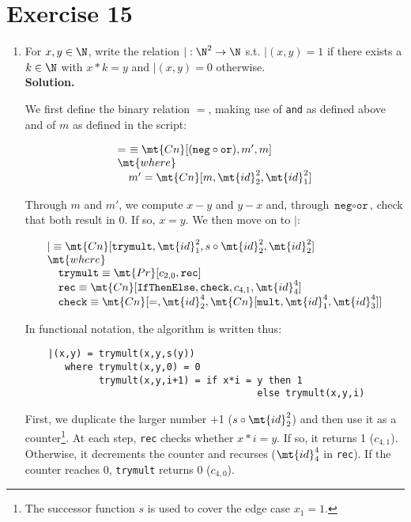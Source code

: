 \section{Exercise 15}

\begin{enumerate}
	\item For $x,y \in \N$, write the relation $| : \N^2 \rightarrow \N$ s.t. $|(x,y) = 1$ if there exists a $k \in \N$ with $x*k = y$ and $|(x,y) = 0$ otherwise.\\
	
	\textbf{Solution.}
	
	We first define the binary relation $=$, making use of \texttt{and} as defined above and of $m$ as defined in the script:
	
	$$
		\begin{array}{l}
			=\ \equiv \mt{Cn}[(\texttt{neg} \circ \texttt{or}), m', m]\\
			\mt{where}\\
			\quad m' = \mt{Cn}[m, \mt{id}^2_2, \mt{id}^2_1]
		\end{array}
	$$
	
	Through $m$ and $m'$, we compute $x - y$ and $y - x$ and, through $\texttt{neg} \circ \texttt{or}$, check that both result in $0$. If so, $x = y$. We then move on to $|$:
	
	$$
		\begin{array}{l}
			| \equiv \mt{Cn}[\texttt{trymult}, \mt{id}^2_1, s \circ \mt{id}^2_2, \mt{id}^2_2]\\
			\mt{where}\\
			\quad \texttt{trymult} \equiv \mt{Pr}[c_{2,0}, \texttt{rec}]\\
			\quad \texttt{rec} \equiv \mt{Cn}[\texttt{IfThenElse}, \texttt{check}, c_{4,1}, \mt{id}^4_4]\\
			\quad \texttt{check} \equiv \mt{Cn}[=, \mt{id}^4_2, \mt{Cn}[\texttt{mult}, \mt{id}^4_1, \mt{id}^4_3]]
		\end{array}
	$$
	
	In functional notation, the algorithm is written thus:
	\begin{verbatim}
	|(x,y) = trymult(x,y,s(y))
	   where trymult(x,y,0) = 0
	         trymult(x,y,i+1) = if x*i = y then 1
	                                     else trymult(x,y,i)
	\end{verbatim}
	
	First, we duplicate the larger number +1 ($s \circ \mt{id}^2_2$) and then use it as a counter\footnote{The successor function $s$ is used to cover the edge case $x_1 = 1$.}. At each step, \texttt{rec} checks whether $x*i = y$. If so, it returns 1 ($c_{4,1}$). Otherwise, it decrements the counter and recurses ($\mt{id}^4_4$ in \texttt{rec}). If the counter reaches 0, \texttt{trymult} returns 0 ($c_{4,0}$).
	

\end{enumerate}
